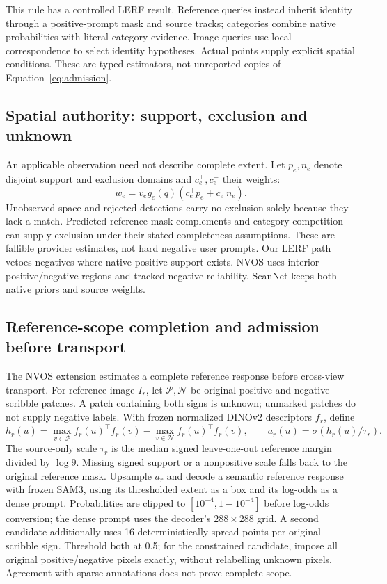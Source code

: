 This rule has a controlled LERF result. Reference queries instead inherit
identity through a positive-prompt mask and source tracks; categories combine
native probabilities with literal-category evidence. Image queries use local
correspondence to select identity hypotheses. Actual points supply explicit
spatial conditions. These are typed estimators, not unreported copies of
Equation~\ref{eq:admission}.

\subsection{Spatial authority: support, exclusion and unknown}
An applicable observation need not describe complete extent. Let $p_e,n_e$
denote disjoint support and exclusion domains and $c_e^+,c_e^-$ their weights:
\begin{equation}
 w_e=v_e g_e(q)(c_e^+p_e+c_e^-n_e).
 \label{eq:authority}
\end{equation}
Unobserved space and rejected detections carry no exclusion solely because they
lack a match. Predicted reference-mask complements and category competition can supply
exclusion under their stated completeness assumptions. These are fallible
provider estimates, not hard negative user prompts. Our LERF path vetoes negatives where
native positive support exists. NVOS uses interior positive/negative regions and
tracked negative reliability. ScanNet keeps both native priors and source weights.

\subsection{Reference-scope completion and admission before transport}\label{sec:reference-completion}
The NVOS extension estimates a complete reference response before cross-view
transport. For reference image $I_r$, let $\mathcal P,\mathcal N$ be original
positive and negative scribble patches. A patch containing both signs is unknown;
unmarked patches do not supply negative labels. With frozen normalized DINOv2
descriptors $f_r$, define
\[
 h_r(u)=\max_{v\in\mathcal P} f_r(u)^\top f_r(v)
       -\max_{v\in\mathcal N} f_r(u)^\top f_r(v),
 \qquad a_r(u)=\sigma(h_r(u)/\tau_r).
\]
The source-only scale $\tau_r$ is the median signed leave-one-out reference
margin divided by $\log9$. Missing signed support or a nonpositive scale falls
back to the original reference mask. Upsample $a_r$ and decode a semantic reference response with frozen SAM3,
using its thresholded extent as a box and its log-odds as a dense prompt.
Probabilities are clipped to $[10^{-4},1-10^{-4}]$ before log-odds conversion;
the dense prompt uses the decoder's $288\times288$ grid. A second candidate additionally uses 16 deterministically spread points
per original scribble sign. Threshold both at 0.5; for the constrained candidate,
impose all original positive/negative pixels exactly, without relabelling
unknown pixels. Agreement with sparse annotations does not prove complete scope.

